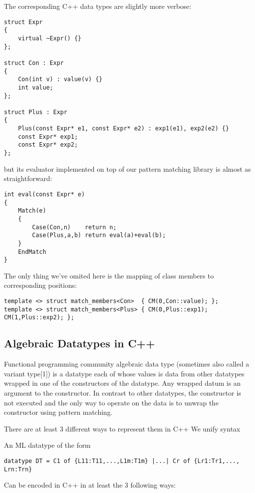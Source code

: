 \documentclass[submission,copyright]{eptcs}
\begin{document}
The corresponding C++ data types are slightly more verbose:

\begin{lstlisting}
struct Expr 
{ 
    virtual ~Expr() {} 
};

struct Con : Expr
{
    Con(int v) : value(v) {}
    int value;
};

struct Plus : Expr
{
    Plus(const Expr* e1, const Expr* e2) : exp1(e1), exp2(e2) {}
    const Expr* exp1;
    const Expr* exp2;
};
\end{lstlisting}

but its evaluator implemented on top of our pattern matching library is almost 
as straightforward:

\begin{lstlisting}
int eval(const Expr* e)
{
    Match(e)
    {
        Case(Con,n)    return n;
        Case(Plus,a,b) return eval(a)+eval(b);
    }
    EndMatch
}
\end{lstlisting}

The only thing we've omited here is the mapping of class members to 
corresponding positions:

\begin{lstlisting}
template <> struct match_members<Con>  { CM(0,Con::value); };
template <> struct match_members<Plus> { CM(0,Plus::exp1); CM(1,Plus::exp2); };
\end{lstlisting}

\subsection{Algebraic Datatypes in C++}

Functional programming community 
algebraic data type (sometimes also called a variant type[1]) is a datatype each 
of whose values is data from other datatypes wrapped in one of the constructors 
of the datatype. Any wrapped datum is an argument to the constructor. In 
contrast to other datatypes, the constructor is not executed and the only way to 
operate on the data is to unwrap the constructor using pattern matching.

There are at least 3 different ways to represent them in C++
We unify syntax 

An ML datatype of the form 

\begin{lstlisting}
datatype DT = C1 of {L11:T11,...,L1m:T1m} |...| Cr of {Lr1:Tr1,..., Lrn:Trn}
\end{lstlisting}

Can be encoded in C++ in at least the 3 following ways:
\end{document}

